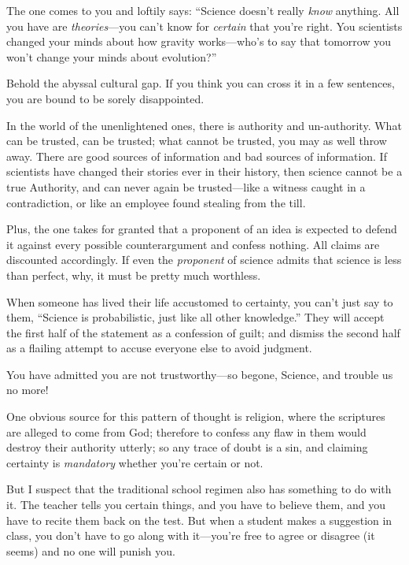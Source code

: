 \myendsectiontext


\bigskip


{
 The one comes to you and loftily says: ``Science
doesn't really \textit{know} anything. All you have are
\textit{theories}{}---you can't know for
\textit{certain} that you're right. You scientists
changed your minds about how gravity works---who's to
say that tomorrow you won't change your minds about
evolution?'' }

{
 Behold the abyssal cultural gap. If you think you can cross it in
a few sentences, you are bound to be sorely disappointed.}

{
 In the world of the unenlightened ones, there is authority and
un-authority. What can be trusted, can be trusted; what cannot be
trusted, you may as well throw away. There are good sources of
information and bad sources of information. If scientists have changed
their stories ever in their history, then science cannot be a true
Authority, and can never again be trusted---like a witness caught in a
contradiction, or like an employee found stealing from the till.}

{
 Plus, the one takes for granted that a proponent of an idea is
expected to defend it against every possible counterargument and
confess nothing. All claims are discounted accordingly. If even the
\textit{proponent} of science admits that science is less than perfect,
why, it must be pretty much worthless.}

{
 When someone has lived their life accustomed to certainty, you
can't just say to them, ``Science is
probabilistic, just like all other knowledge.'' They
will accept the first half of the statement as a confession of guilt;
and dismiss the second half as a flailing attempt to accuse everyone
else to avoid judgment.}

{
 You have admitted you are not trustworthy---so begone, Science,
and trouble us no more!}

{
 One obvious source for this pattern of thought is religion, where
the scriptures are alleged to come from God; therefore to confess any
flaw in them would destroy their authority utterly; so any trace of
doubt is a sin, and claiming certainty is \textit{mandatory} whether
you're certain or not.}

{
 But I suspect that the traditional school regimen also has
something to do with it. The teacher tells you certain things, and you
have to believe them, and you have to recite them back on the test. But
when a student makes a suggestion in class, you don't
have to go along with it---you're free to agree or
disagree (it seems) and no one will punish you.}

